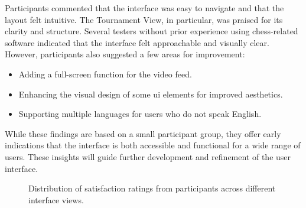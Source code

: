 Participants commented that the interface was easy to navigate and that the layout felt intuitive. The Tournament View, in particular, was praised for its clarity and structure. Several testers without prior experience using chess-related software indicated that the interface felt approachable and visually clear. \\

However, participants also suggested a few areas for improvement:

\begin{itemize}
    \item Adding a full-screen function for the video feed.
    \item Enhancing the visual design of some \gls{ui} elements for improved aesthetics.
    \item Supporting multiple languages for users who do not speak English.
\end{itemize}

While these findings are based on a small participant group, they offer early indications that the interface is both accessible and functional for a wide range of users. These insights will guide further development and refinement of the user interface.

\begin{figure}[h!]
\centering
{}
\caption[Satisfaction rating distribution]{Distribution of satisfaction ratings from participants across different interface views.}
\label{fig:wireframe-test-results}
\end{figure}



